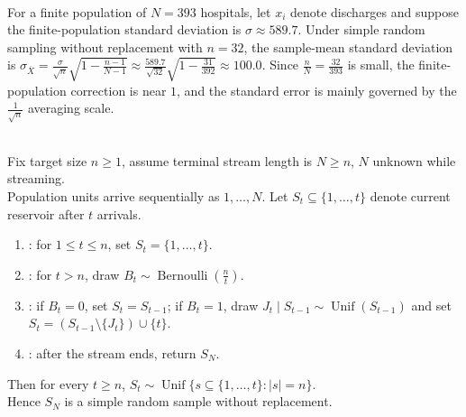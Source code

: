 \begin{example} \label{ex:srs-finite-population-correction-hospitals} \\
For a finite population of $N=393$ hospitals, let $x_i$ denote discharges and suppose the finite-population standard deviation is $\sigma\approx589.7$.
Under simple random sampling without replacement with $n=32$, the sample-mean standard deviation is $\sigma_{\overline{X}}=\frac{\sigma}{\sqrt{n}}\sqrt{1-\frac{n-1}{N-1}}\approx\frac{589.7}{\sqrt{32}}\sqrt{1-\frac{31}{392}}\approx100.0$.
Since $\frac{n}{N}=\frac{32}{393}$ is small, the finite-population correction is near $1$, and the standard error is mainly governed by the $\frac{1}{\sqrt n}$ averaging scale.
\end{example}

\begin{method} \label{meth:reservoir-sampling-simple-random-sample} \\
Fix target size $n\geq1$, assume terminal stream length is $N\geq n$, $N$ unknown while streaming.\\
Population units arrive sequentially as $1,\ldots,N$. Let $S_t\subseteq\{1,\ldots,t\}$ denote current reservoir after $t$ arrivals.
\begin{enumerate}[label=(\roman*)]
\setlength{\itemsep}{0pt}
\item {}: for $1\leq t\leq n$, set $S_t=\{1,\ldots,t\}$.
\item {}: for $t>n$, draw $B_t\sim\operatorname{Bernoulli}(\frac{n}{t})$.
\item {}: if $B_t=0$, set $S_t=S_{t-1}$; if $B_t=1$, draw $J_t\mid S_{t-1}\sim\operatorname{Unif}(S_{t-1})$ and set $S_t=(S_{t-1}\setminus\{J_t\})\cup\{t\}$.
\item {}: after the stream ends, return $S_N$.
\end{enumerate}
Then for every $t\geq n$, $S_t\sim\operatorname{Unif}\{s\subseteq\{1,\ldots,t\}:|s|=n\}$.\\
Hence $S_N$ is a simple random sample without replacement.
\end{method}
